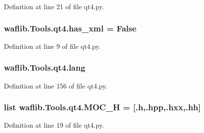 Definition at line 21 of file qt4.\+py.

\subsubsection[{\texorpdfstring{has\+\_\+xml}{has_xml}}]{ waflib.\+Tools.\+qt4.\+has\+\_\+xml = False}\hypertarget{namespacewaflib_1_1_tools_1_1qt4_ab8c194042f1234950ed5a34031af55f4}{}\label{namespacewaflib_1_1_tools_1_1qt4_ab8c194042f1234950ed5a34031af55f4}


Definition at line 9 of file qt4.\+py.

\subsubsection[{\texorpdfstring{lang}{lang}}]{\setlength{\rightskip}{0pt plus 5cm}waflib.\+Tools.\+qt4.\+lang}\hypertarget{namespacewaflib_1_1_tools_1_1qt4_a1410657c327d97e1b283cb08a32121f4}{}\label{namespacewaflib_1_1_tools_1_1qt4_a1410657c327d97e1b283cb08a32121f4}


Definition at line 156 of file qt4.\+py.

\subsubsection[{\texorpdfstring{M\+O\+C\+\_\+H}{MOC_H}}]{\setlength{\rightskip}{0pt plus 5cm}list waflib.\+Tools.\+qt4.\+M\+O\+C\+\_\+H = \mbox{[}\textquotesingle{}.h\textquotesingle{},\textquotesingle{}.hpp\textquotesingle{},\textquotesingle{}.hxx\textquotesingle{},\textquotesingle{}.hh\textquotesingle{}\mbox{]}}\hypertarget{namespacewaflib_1_1_tools_1_1qt4_abca604c664ad1bad3587166900f67980}{}\label{namespacewaflib_1_1_tools_1_1qt4_abca604c664ad1bad3587166900f67980}


Definition at line 19 of file qt4.\+py.

